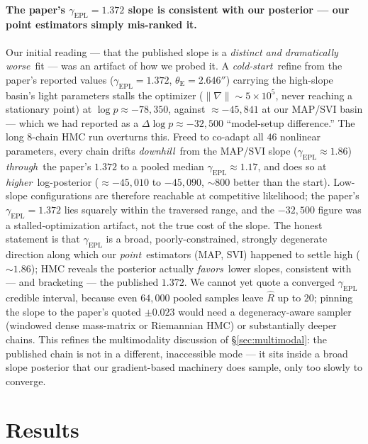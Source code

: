 \documentclass[11pt,letterpaper]{article}
\newcommand{\thetaE}{\ensuremath{\theta_{\mathrm{E}}}}
\newcommand{\gammaEPL}{\ensuremath{\gamma_{\mathrm{EPL}}}}
\begin{document}
\paragraph{The paper's $\gammaEPL=1.372$ slope is consistent with our
posterior --- our point estimators simply mis-ranked it.} Our initial
reading --- that the published slope is a {\it distinct and dramatically
worse}\ fit --- was an artifact of how we probed it. A {\it cold-start}\
refine from the paper's reported values ($\gammaEPL=1.372$,
$\thetaE=2.646''$) carrying the high-slope basin's light parameters
stalls the optimizer ($\|\nabla\|\sim5\times10^{5}$, never reaching a
stationary point) at $\log p\approx-78{,}350$, against $\approx-45{,}841$
at our MAP/SVI basin --- which we had reported as a
$\Delta\log p\approx-32{,}500$ ``model-setup difference.'' The long
$8$-chain HMC run overturns this. Freed to co-adapt all $46$ nonlinear
parameters, every chain drifts {\it downhill}\ from the MAP/SVI slope
($\gammaEPL\approx1.86$) {\it through}\ the paper's $1.372$ to a pooled
median $\gammaEPL\approx1.17$, and does so at {\it higher}\ log-posterior
($\approx-45{,}010$ to $-45{,}090$, $\sim$$800$ better than the start).
Low-slope configurations are therefore reachable at competitive
likelihood; the paper's $\gammaEPL=1.372$ lies squarely within the
traversed range, and the $-32{,}500$ figure was a stalled-optimization
artifact, not the true cost of the slope. The honest statement is that
$\gammaEPL$ is a broad, poorly-constrained, strongly degenerate direction
along which our {\it point}\ estimators (MAP, SVI) happened to settle high
($\sim$$1.86$); HMC reveals the posterior actually {\it favors}\ lower
slopes, consistent with --- and bracketing --- the published $1.372$. We
cannot yet quote a converged $\gammaEPL$ credible interval, because even
$64{,}000$ pooled samples leave $\hat R$ up to $20$; pinning the slope to
the paper's quoted $\pm0.023$ would need a degeneracy-aware sampler
(windowed dense mass-matrix or Riemannian HMC) or substantially deeper
chains. This refines the multimodality discussion of
\S\ref{sec:multimodal}: the published chain is not in a different,
inaccessible mode --- it sits inside a broad slope posterior that our
gradient-based machinery does sample, only too slowly to converge.

\section{Results}
\label{sec:results}
\end{document}
